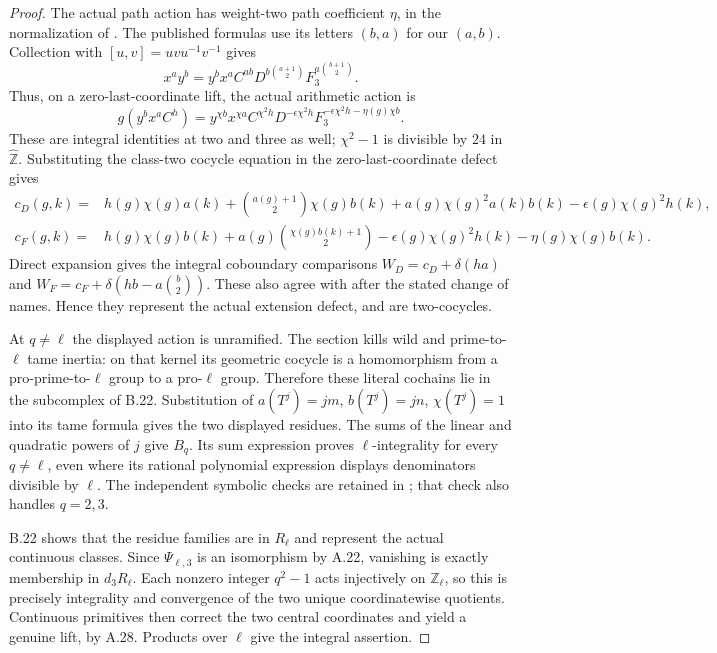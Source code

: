 \begin{proof}
The actual path action has weight-two path coefficient $\eta$, in the
normalization of \cite[(12.12), (12.19), (12.35)]{CohWickelgren2012}.
The published formulas use its letters $(b,a)$ for our $(a,b)$.
Collection with $[u,v]=uvu^{-1}v^{-1}$ gives
\[
 x^a y^b=y^b x^a C^{ab}
       D^{b\binom{a+1}{2}}F_3^{a\binom{b+1}{2}}.
\]
Thus, on a zero-last-coordinate lift, the actual arithmetic action is
\[
 g(y^b x^a C^h)=y^{\chi b}x^{\chi a}C^{\chi^2h}
           D^{-\epsilon\chi^2h}
           F_3^{-\epsilon\chi^2h-\eta(g)\chi b}.
\]
These are integral identities at two and three as well; $\chi^2-1$
is divisible by $24$ in $\widehat{\mathbb Z}$. Substituting the
class-two cocycle equation in the zero-last-coordinate defect gives
\begin{align*}
 c_D(g,k)={}&h(g)\chi(g)a(k)
    +\binom{a(g)+1}{2}\chi(g)b(k)
    +a(g)\chi(g)^2a(k)b(k)-\epsilon(g)\chi(g)^2h(k),\\
 c_F(g,k)={}&h(g)\chi(g)b(k)
    +a(g)\binom{\chi(g)b(k)+1}{2}
    -\epsilon(g)\chi(g)^2h(k)-\eta(g)\chi(g)b(k).
\end{align*}
Direct expansion gives the integral coboundary comparisons
$W_D=c_D+\delta(ha)$ and
$W_F=c_F+\delta(hb-a\binom b2)$. These also agree with
\cite[Propositions 13 and 17, author pp.~17, 19]{CohWickelgren2012} after the stated
change of names. Hence they represent the actual extension defect,
and are two-cocycles.

At $q\ne\ell$ the displayed action is unramified. The section
kills wild and prime-to-$\ell$ tame inertia: on that kernel its
geometric cocycle is a homomorphism from a pro-prime-to-$\ell$ group
to a pro-$\ell$ group. Therefore these literal cochains lie in
the subcomplex of B.22. Substitution of
$a(T^j)=jm$, $b(T^j)=jn$, $\chi(T^j)=1$ into its tame formula
gives the two displayed residues. The sums of the linear and
quadratic powers of $j$ give $B_q$. Its sum expression proves
$\ell$-integrality for every $q\ne\ell$, even where its rational
polynomial expression displays denominators divisible by $\ell$.
The independent symbolic checks are retained in
; that check also handles $q=2,3$.

B.22 shows that the residue families are in $R_\ell$ and represent
the actual continuous classes. Since $\Psi_{\ell,3}$ is an
isomorphism by A.22, vanishing is exactly membership in $d_3R_\ell$.
Each nonzero integer $q^2-1$ acts injectively on $\mathbb Z_\ell$,
so this is precisely integrality and convergence of the two unique
coordinatewise quotients. Continuous primitives then correct the
two central coordinates and yield a genuine lift, by A.28. Products
over $\ell$ give the integral assertion.
\end{proof}


